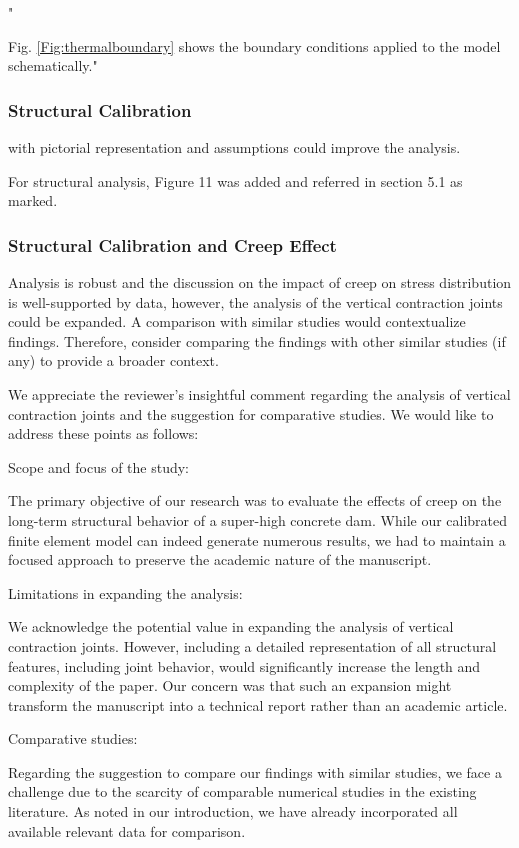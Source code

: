 \documentclass{ar2rc}
\begin{document}
	"{Fig. \ref{Fig:thermalboundary} shows the boundary conditions applied to the model schematically."
	
	\subsubsection{Structural Calibration}
	
	\RC with pictorial representation and assumptions could improve the
	analysis.
	
	\AR For structural analysis, Figure 11 was added and referred in section 5.1 as marked. 
	
	\subsubsection{Structural Calibration and Creep Effect}
	
	\RC Analysis is robust and the discussion on the impact of creep on stress
	distribution is well-supported by data, however, the analysis of the vertical contraction joints could be expanded. A comparison with similar studies would contextualize findings. Therefore, consider comparing the findings with other similar studies (if any) to provide a broader context.

	\AR We appreciate the reviewer's insightful comment regarding the analysis of vertical contraction joints and the suggestion for comparative studies. We would like to address these points as follows:

	Scope and focus of the study:

	The primary objective of our research was to evaluate the effects of creep on the long-term structural behavior of a super-high concrete dam. While our calibrated finite element model can indeed generate numerous results, we had to maintain a focused approach to preserve the academic nature of the manuscript.

	Limitations in expanding the analysis:

	We acknowledge the potential value in expanding the analysis of vertical contraction joints. However, including a detailed representation of all structural features, including joint behavior, would significantly increase the length and complexity of the paper. Our concern was that such an expansion might transform the manuscript into a technical report rather than an academic article.

	Comparative studies:

	Regarding the suggestion to compare our findings with similar studies, we face a challenge due to the scarcity of comparable numerical studies in the existing literature. As noted in our introduction, we have already incorporated all available relevant data for comparison.

}
\end{document}
